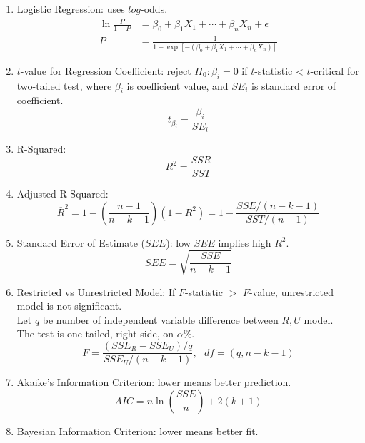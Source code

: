 \begin{enumerate}[label=\roman*.]
\setlength{\itemsep}{0pt}
\item Logistic Regression: uses $log$-odds.
\begin{align}
\ln \frac{P}{1-P} &= \beta_0 + \beta_1 X_1 + \cdots + \beta_n X_n + \epsilon \nonumber \\
P &= \frac{1}{1 + \exp[-(\beta_0 + \beta_1 X_1 + \cdots + \beta_n X_n)]} \nonumber
\end{align}
\item $t$-value for Regression Coefficient: reject $H_0: \beta_i = 0$ if $t$-statistic < $t$-critical for two-tailed test, where $\beta_i$ is coefficient value, and $SE_i$ is standard error of coefficient.
\begin{equation}
t_{\beta_i} = \frac{\beta_i}{SE_i} \nonumber
\end{equation}
\item R-Squared: 
\begin{equation}
R^2 = \frac{SSR}{SST} \nonumber
\end{equation}
\item Adjusted R-Squared:
\begin{equation}
\overline{R}^2 = 1 - \left( \frac{n-1}{n-k-1} \right)(1-R^2) = 1 - \frac{SSE / (n-k-1)}{SST/(n-1)} \nonumber
\end{equation}
\item Standard Error of Estimate ($SEE$): low $SEE$ implies high $R^2$.
\begin{equation}
SEE = \sqrt{\frac{SSE}{n-k-1}} \nonumber
\end{equation}
\item Restricted vs Unrestricted Model: If $F$-statistic $>$ $F$-value, unrestricted model is not significant.\\
Let $q$ be number of independent variable difference between $R, U$ model.\\
The test is one-tailed, right side, on $\alpha \%$.
\begin{equation}
F = \frac{(SSE_R - SSE_U)/q}{SSE_U/(n-k-1)}, \ \ \ df = (q, n-k-1) \nonumber
\end{equation}
\item Akaike's Information Criterion: lower means better prediction.
\begin{equation}
AIC = n \ln \left( \frac{SSE}{n} \right) + 2 (k+1) \nonumber
\end{equation}
\item Bayesian Information Criterion: lower means better fit.
\begin{equation}

\end{equation}
\end{enumerate}
